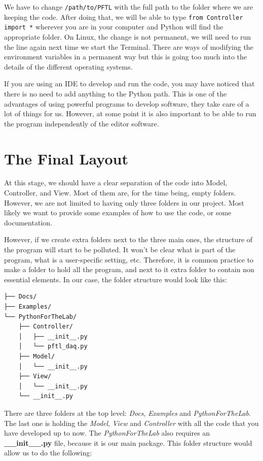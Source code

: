We have to change \texttt{/path/to/PFTL} with the full path to the folder where we are keeping the code. After doing that, we will be able to type \texttt{from Controller import *} wherever you are in your computer and Python will find the appropriate folder. On Linux, the change is not permanent, we will need to run the line again next time we start the Terminal. There are ways of modifying the environment variables in a permanent way but this is going too much into the details of the different operating systems. 

If you are using an IDE to develop and run the code, you may have noticed that there is no need to add anything to the Python path. This is one of the advantages of using powerful programs to develop software, they take care of a lot of things for us. However, at some point it is also important to be able to run the program independently of the editor software. 

\section{The Final Layout}\label{section:final-layout}
At this stage, we should have a clear separation of the code into Model, Controller, and View. Most of them are, for the time being, empty folders. However, we are not limited to having only three folders in our project. Most likely we want to provide some examples of how to use the code, or some documentation. 

However, if we create extra folders next to the three main ones, the structure of the program will start to be polluted. It won't be clear what is part of the program, what is a user-specific setting, etc. Therefore, it is common practice to make a folder to hold all the program, and next to it extra folder to contain non essential elements. In our case, the folder structure would look like this:

\begin{verbatim}
├── Docs/
├── Examples/
└── PythonForTheLab/
    ├── Controller/
    │   ├── __init__.py
    │   └── pftl_daq.py
    ├── Model/
    │   └── __init__.py
    ├── View/
    │   └── __init__.py
    └── __init__.py
\end{verbatim}

There are three folders at the top level: \emph{Docs}, \emph{Examples} and \emph{PythonForTheLab}. The last one is holding the \emph{Model}, \emph{View} and \emph{Controller} with all the code that you have developed up to now. The \emph{PythonForTheLab} also requires an \textbf{\_\_init\_\_.py} file, because it is our main package. This folder structure would allow us to do the following:

